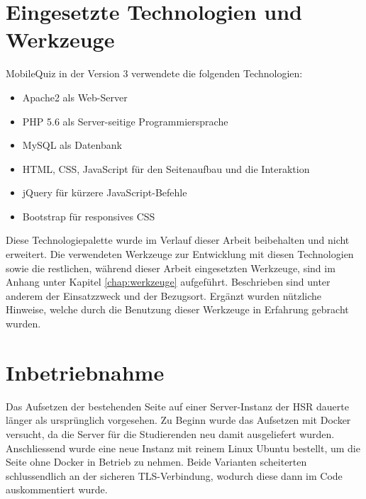 



\section{Eingesetzte Technologien und Werkzeuge}
MobileQuiz in der Version 3 verwendete die folgenden Technologien:

\begin{itemize}
	\item Apache2 als Web-Server
	\item PHP 5.6 als Server-seitige Programmiersprache
	\item MySQL als Datenbank
	\item HTML, CSS, JavaScript für den Seitenaufbau und die Interaktion
	\item jQuery für kürzere JavaScript-Befehle
	\item Bootstrap für \gls{responsives CSS}
\end{itemize}

Diese Technologiepalette wurde im Verlauf dieser Arbeit beibehalten und nicht erweitert. Die verwendeten Werkzeuge zur Entwicklung mit diesen Technologien sowie die restlichen, während dieser Arbeit eingesetzten Werkzeuge, sind im Anhang unter Kapitel \ref{chap:werkzeuge} aufgeführt. Beschrieben sind unter anderem der Einsatzzweck und der Bezugsort. Ergänzt wurden nützliche Hinweise, welche durch die Benutzung dieser Werkzeuge in Erfahrung gebracht wurden.


\section{Inbetriebnahme}
Das Aufsetzen der bestehenden Seite auf einer Server-Instanz der HSR dauerte länger als ursprünglich vorgesehen. Zu Beginn wurde das Aufsetzen mit Docker versucht, da die Server für die Studierenden neu damit ausgeliefert wurden. Anschliessend wurde eine neue Instanz mit reinem Linux Ubuntu bestellt, um die Seite ohne Docker in Betrieb zu nehmen. Beide Varianten scheiterten schlussendlich an der sicheren \gls{TLS}-Verbindung, wodurch diese dann im Code auskommentiert wurde.

